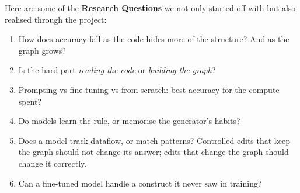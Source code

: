 \documentclass[twoside,english]{article}
\begin{document}
Here are some of the \textbf{Research Questions} we not only started off with but also realised through the project:
\begin{enumerate}
	\item How does accuracy fall as the code hides more of the structure? And as
	the graph grows?
	\item Is the hard part \emph{reading the code} or \emph{building the graph}?
	\item Prompting vs fine-tuning vs from scratch: best accuracy for the compute spent?
	\item Do models learn the rule, or memorise the generator's habits?
	\item Does a model track dataflow, or match patterns? Controlled edits that keep the graph
	should not change its answer; edits that change the graph should change it correctly.
	\item Can a fine-tuned model handle a construct it never saw in training?
\end{enumerate}
\end{document}
